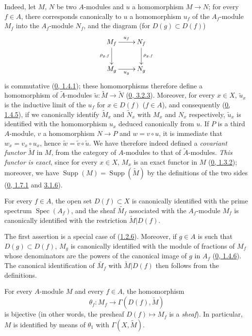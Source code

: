 Indeed, let $M$, $N$ be two $A$-modules and $u$ a homomorphism
$M\to N$; for every $f\in A$, there corresponds canonically to $u$ a
homomorphism $u_f$ of the $A_f$-module $M_f$ into the $A_f$-module $N_f$,
and the diagram (for $D(g)\subset D(f)$)
\[
  \xymatrix{
    M_f\ar[r]^{u_f}\ar[d]_{\rho_{g,f}} & N_f\ar[d]^{\rho_{g,f}}\\
    M_g\ar[r]_{u_g} & N_g
  }
\]
is commutative (\hyperref[0.1.4.1]{0, 1.4.1}); these homomorphisms
therefore define a homomorphism of $\widetilde{A}$-modules
$\widetilde{u}:\widetilde{M}\to\widetilde{N}$
(\hyperref[0.3.2.3]{0, 3.2.3}). Moreover, for every $x\in X$,
$\widetilde{u}_x$ is the inductive limit of the $u_f$ for $x\in D(f)$
($f\in A$), and consequently (\hyperref[0.1.4.5]{0, 1.4.5}), if we
canonically identify $\widetilde{M}_x$ and $\widetilde{N}_x$ with $M_x$ and
$N_x$ respectively, $\widetilde{u}_x$ is identified with the homomorphism
$u_x$ deduced canonically from $u$. If $P$ is a third $A$-module, $v$ a
homomorphism $N\to P$ and $w=v\circ u$, it is immediate that
$w_x=v_x\circ u_x$, hence $\widetilde{w}=\widetilde{v}\circ\widetilde{u}$.
We have therefore indeed defined a \emph{covariant functor} $\widetilde{M}$
in $M$, from the category of $A$-modules to that of $\widetilde{A}$-modules.
\emph{This functor is exact}, since for every $x\in X$, $M_x$ is an exact
functor in $M$ (\hyperref[0.1.3.2]{0, 1.3.2}); moreover, we have
$\operatorname{Supp}(M)=\operatorname{Supp}(\widetilde{M})$ by the
definitions of the two sides (\hyperref[0.1.7.1]{0, 1.7.1} and
\hyperref[0.3.1.6]{3.1.6}).

\begin{proposition}[1.3.6]
\label{I.1.3.6}
For every $f\in A$, the open set $D(f)\subset X$ is canonically identified
with the prime spectrum $\operatorname{Spec}(A_f)$, and the sheaf
$\widetilde{M_f}$ associated with the $A_f$-module $M_f$ is canonically
identified with the restriction $\widetilde{M}|D(f)$.
\end{proposition}

The first assertion is a special case of
(\hyperref[I.1.2.6]{1.2.6}). Moreover, if $g\in A$ is such that
$D(g)\subset D(f)$, $M_g$ is canonically identified with the module of
fractions of $M_f$ whose denominators are the powers of the canonical image
of $g$ in $A_f$ (\hyperref[0.1.4.6]{0, 1.4.6}). The canonical
identification of $\widetilde{M_f}$ with $\widetilde{M}|D(f)$ then follows
from the definitions.

\begin{theorem}[1.3.7]
\label{I.1.3.7}
For every $A$-module $M$ and every $f\in A$, the homomorphism
\[
  \theta_f:M_f\longrightarrow\Gamma(D(f),\widetilde{M})
\]
is bijective (in other words, the presheaf $D(f)\mapsto M_f$ is a
\emph{sheaf}). In particular, $M$ is identified by means of $\theta_1$ with
$\Gamma(X,\widetilde{M})$.
\end{theorem}

